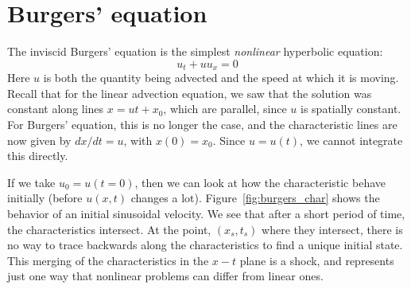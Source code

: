 
\begin{quote}
\end{quote}


\section{Burgers' equation}

The inviscid Burgers' equation is the simplest {\em nonlinear} hyperbolic
equation:
\begin{equation}
u_t + u u_x = 0
\end{equation}
Here $u$ is both the quantity being advected and the speed at which 
it is moving.  Recall that for the linear advection equation, we saw
that the solution was constant along lines $x = ut + x_0$, which are
parallel, since $u$ is spatially constant.  For Burgers' equation, 
this is no longer the case, and the characteristic lines are now
given by $dx/dt = u$, with $x(0) = x_0$.  Since $u = u(t)$, we cannot
integrate this directly.   

If we take $u_0 = u(t=0)$, then we can look at how the characteristic
behave initially (before $u(x,t)$ changes a lot).
Figure~\ref{fig:burgers_char} shows the behavior of an initial
sinusoidal velocity.  We see that after a short period of time, the
characteristics intersect.  At the point, $(x_s, t_s)$ where they 
intersect, there is no way to trace backwards along the characteristics to
find a unique initial state.  This merging of the characteristics in 
the $x-t$ plane is a shock, and represents just one way that nonlinear
problems can differ from linear ones.

